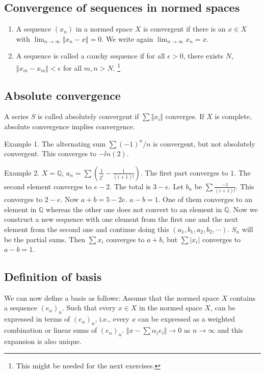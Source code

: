 \documentclass[11pt]{article}
\def\Q{\mathbb{Q}}
\begin{document}
\subsection{Convergence of sequences in normed spaces}
\label{sec:orgea60cc3}
\begin{enumerate}
\item A sequence \((x_n)\) in a normed space \(X\) is convergent if there is an \(x\in
      X\) with \(\lim_{n\rightarrow \infty} \Vert x_n - x\Vert = 0\). We write again
\(\lim_{n\rightarrow \infty} x_n = x\).
\item A sequence is called a cauchy sequence if for all \(\epsilon > 0\), there
exists \(N\), \(\Vert x_m - x_m \Vert < \epsilon\) for all \(m, n > N\). \footnote{This might be needed for the next exercises.}
\end{enumerate}
\subsection{Absolute convergence}
\label{sec:org25a03e5}
A series \(S\) is called absolutely convergent if \(\sum \Vert x_i \Vert\)
converges. If \(X\) is complete, absolute convergence implies convergence.

Example 1. The alternating sum \(\sum (-1)^n/n\) is convergent, but not
absolutely convergent. This converges to \(-ln(2)\).

Example 2. \(X = \Q\), \(a_n = \sum \left(\frac{1}{2^{i}} -
   \frac1{(i+1)!}\right)\). The first part converges to \(1\). The second element
converges to \(e-2\). The total is \(3-e\). Let \(b_n\) be \(\sum
   \frac{-1}{(i+1)!}\). This converges to \(2 - e\). Now \(a + b = 5 - 2e\). \(a - b =
   1\). One of them converges to an element in \(\Q\) whereas the other one does
not convert to an element in \(\Q\). Now we construct a new sequence with one
element from the first one and the next element from the second one and
continue doing this \((a_1, b_1, a_2, b_2, \cdots)\). \(S_n\) will be the partial
sums. Then \(\sum x_i\) converges to \(a+b\), but \(\sum \vert x_i \vert\)
converges to \(a - b = 1\).
\subsection{Definition of basis}
\label{sec:org55f628d}
We can now define a basis as follows: Assume that the normed space \(X\)
contains a sequence \((e_n)_n\). Such that every \(x \in X\) in the normed space
\(X\), can be expressed in terms of \((e_n)_n\), i.e., every \(x\) can be expressed
as a weighted combination or linear sums of \((e_n)_n\). \(\Vert x - \sum
   \alpha_i e_i \Vert \rightarrow 0\) as \(n \rightarrow \infty\) and this
expansion is also unique.
\end{document}
